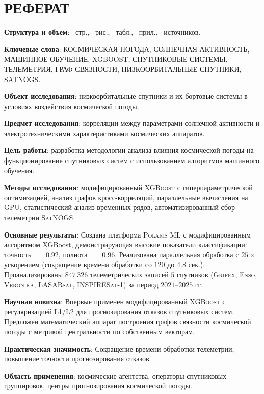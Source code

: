 \chapter*{РЕФЕРАТ}

\textbf{Структура и объем}: \maincontentpages~стр., \totalfigures~рис.,
\totaltables~табл., ~прил., \thetotalsources~источников.

\textbf{Ключевые слова}: КОСМИЧЕСКАЯ ПОГОДА, СОЛНЕЧНАЯ АКТИВНОСТЬ, МАШИННОЕ
ОБУЧЕНИЕ, XGBOOST, СПУТНИКОВЫЕ СИСТЕМЫ, ТЕЛЕМЕТРИЯ, ГРАФ СВЯЗНОСТИ,
НИЗКООРБИТАЛЬНЫЕ СПУТНИКИ, SATNOGS.

\textbf{Объект исследования}: низкоорбитальные спутники и их бортовые системы в
условиях воздействия космической погоды.

\textbf{Предмет исследования}: корреляции между параметрами солнечной активности
и электротехническими характеристиками космических аппаратов.

\textbf{Цель работы}: разработка методологии анализа влияния космической погоды
на функционирование спутниковых систем с использованием алгоритмов машинного
обучения.

\textbf{Методы исследования}: модифицированный \textsc{XGBoost} с
гиперпараметрической оптимизацией, анализ графов кросс-корреляций, параллельные
вычисления на \textsc{GPU}, статистический анализ временных рядов,
автоматизированный сбор телеметрии \textsc{SatNOGS}.

\textbf{Основные результаты}: Создана платформа \textsc{Polaris ML} с 
модифицированным алгоритмом XGBoost, демонстрирующая высокие показатели 
классификации: точность~$=~0.92$, полнота~$=~0.96$. 
Реализована параллельная обработка с $25{\times}$ ускорением 
(сокращение времени обработки со $120$ до $4.8$ сек.). Проанализированы 
$847{\,}326$ телеметрических записей $5$ спутников (\textsc{Grifex}, 
\textsc{Enso}, \textsc{Veronika}, \textsc{LASARsat}, \textsc{INSPIRESat-1}) 
за период $2021$--$2025$ гг.


\textbf{Научная новизна}: Впервые применен модифицированный \textsc{XGBoost} с
регуляризацией L1/L2 для прогнозирования отказов спутниковых систем. Предложен
математический аппарат построения графов связности космической погоды с метрикой
центральности по собственным векторам.

\textbf{Практическая значимость}: Сокращение времени обработки телеметрии,
повышение точности прогнозирования отказов.

\textbf{Область применения}: космические агентства, операторы спутниковых
группировок, центры прогнозирования космической погоды.




